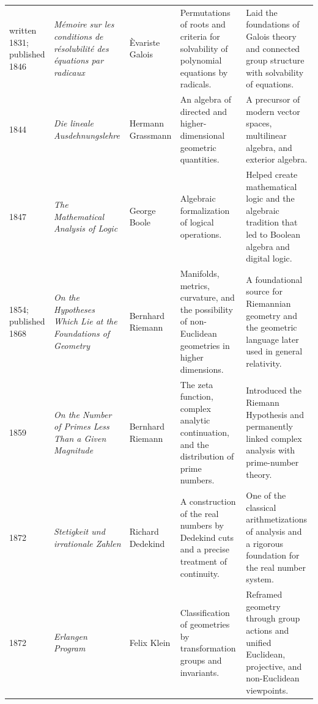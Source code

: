 {\begin{longtable}{@{}L{0.08\textwidth}L{0.21\textwidth}L{0.15\textwidth}L{0.22\textwidth}L{0.26\textwidth}@{}}
        written 1831; published 1846
        & \textit{M\'emoire sur les conditions de r\'esolubilit\'e des \'equations par radicaux}
        & \`Evariste Galois
        & Permutations of roots and criteria for solvability of polynomial equations by radicals.
        & Laid the foundations of Galois theory and connected group structure with solvability of equations. \\

        1844
        & \textit{Die lineale Ausdehnungslehre}
        & Hermann Grassmann
        & An algebra of directed and higher-dimensional geometric quantities.
        & A precursor of modern vector spaces, multilinear algebra, and exterior algebra. \\

        1847
        & \textit{The Mathematical Analysis of Logic}
        & George Boole
        & Algebraic formalization of logical operations.
        & Helped create mathematical logic and the algebraic tradition that led to Boolean algebra and digital logic. \\

        1854; published 1868
        & \textit{On the Hypotheses Which Lie at the Foundations of Geometry}
        & Bernhard Riemann
        & Manifolds, metrics, curvature, and the possibility of non-Euclidean geometries in higher dimensions.
        & A foundational source for Riemannian geometry and the geometric language later used in general relativity. \\

        1859
        & \textit{On the Number of Primes Less Than a Given Magnitude}
        & Bernhard Riemann
        & The zeta function, complex analytic continuation, and the distribution of prime numbers.
        & Introduced the Riemann Hypothesis and permanently linked complex analysis with prime-number theory. \\

        1872
        & \textit{Stetigkeit und irrationale Zahlen}
        & Richard Dedekind
        & A construction of the real numbers by Dedekind cuts and a precise treatment of continuity.
        & One of the classical arithmetizations of analysis and a rigorous foundation for the real number system. \\

        1872
        & \textit{Erlangen Program}
        & Felix Klein
        & Classification of geometries by transformation groups and invariants.
        & Reframed geometry through group actions and unified Euclidean, projective, and non-Euclidean viewpoints. \\


\end{longtable}}
